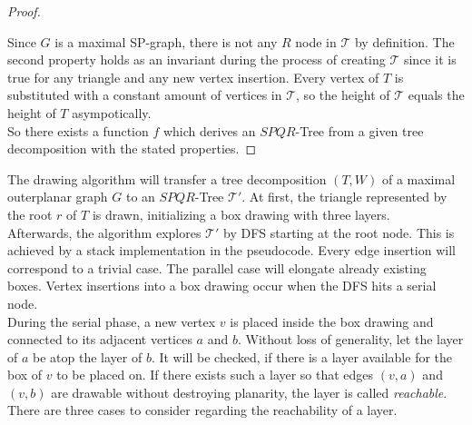 \begin{proof}
\begin{description}
\begin{figure}[H]
		\end{figure}
	\end{description}
	Since $G$ is a maximal SP-graph, there is not any $R$ node in $\mathcal{T}$ by definition. The second property holds as an invariant during the process of creating $\mathcal{T}$ since it is true for any triangle and any new vertex insertion. Every vertex of $T$ is substituted with a constant amount of vertices in $\mathcal{T}$, so the height of $\mathcal{T}$ equals the height of $T$ asympotically.\\
	So there exists a function $f$ which derives an $SPQR$-Tree from a given tree decomposition with the stated properties.
\end{proof}
The drawing algorithm will transfer a tree decomposition $(T,W)$ of a maximal outerplanar graph $G$ to an $SPQR$-Tree $\mathcal{T}'$. At first, the triangle represented by the root $r$ of $T$ is drawn, initializing a box drawing with three layers.\\
Afterwards, the algorithm explores $\mathcal{T}'$ by DFS starting at the root node. This is achieved by a stack implementation in the pseudocode. Every edge insertion will correspond to a trivial case. The parallel case will elongate already existing boxes. Vertex insertions into a box drawing occur when the DFS hits a serial node.\\
During the serial phase, a new vertex $v$ is placed inside the box drawing and connected to its adjacent vertices $a$ and $b$. Without loss of generality, let the layer of $a$ be atop the layer of $b$. It will be checked, if there is a layer available for the box of $v$ to be placed on. If there exists such a layer so that edges $(v,a)$ and $(v,b)$ are drawable without destroying planarity, the layer is called \emph{reachable}.
There are three cases to consider regarding the reachability of a layer.
